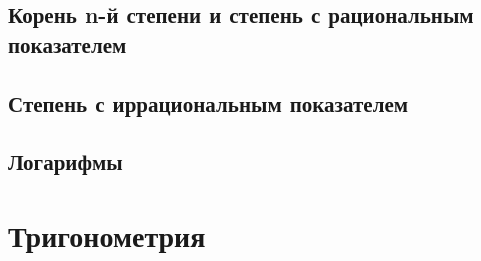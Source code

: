 \documentclass[10pt, a4paper]{article}
\begin{document}
	\subsection{Корень n-й степени и степень с рациональным показателем}
	\subsection{Степень с иррациональным показателем}
	\subsection{Логарифмы}
\section{Тригонометрия}
	
\end{document}
